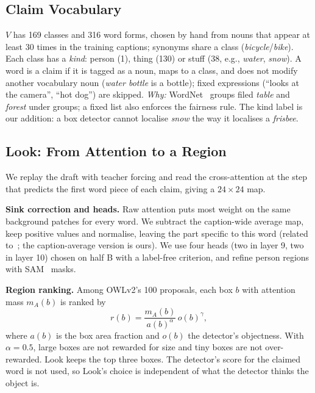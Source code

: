 \documentclass[conference]{IEEEtran}
\begin{document}
\subsection{Claim Vocabulary}
$V$ has 169 classes and 316 word forms, chosen by hand from nouns that appear at least 30 times in the
training captions; synonyms share a class (\emph{bicycle}/\emph{bike}). Each class has a \emph{kind}: person
(1), thing (130) or stuff (38, e.g., \emph{water}, \emph{snow}). A word is a claim if it is tagged as a noun,
maps to a class, and does not modify another vocabulary noun (\emph{water bottle} is a bottle); fixed
expressions (``looks at the camera'', ``hot dog'') are skipped. \emph{Why:} WordNet~\cite{miller1995wordnet}
groups filed \emph{table} and \emph{forest} under groups; a fixed list also enforces the fairness rule. The
kind label is our addition: a box detector cannot localise \emph{snow} the way it localises a \emph{frisbee}.

\subsection{Look: From Attention to a Region}
\label{sec:design-look}
We replay the draft with teacher forcing and read the cross-attention at the step that predicts the first word
piece of each claim, giving a $24\times24$ map.

\textbf{Sink correction and heads.} Raw attention puts most weight on the same background patches for every
word. We subtract the caption-wide average map, keep positive values and normalise, leaving the part specific
to this word (related to~\cite{darcet2024vision,xiao2024efficient}; the caption-average version is ours). We
use four heads (two in layer 9, two in layer 10) chosen on half B with a label-free criterion, and refine
person regions with SAM~\cite{kirillov2023segment} masks.

\textbf{Region ranking.} Among OWLv2's 100 proposals, each box $b$ with attention mass $m_A(b)$ is ranked by
\begin{equation}
r(b) = \frac{m_A(b)}{a(b)^{\alpha}}\, o(b)^{\gamma},
\label{eq:rank}
\end{equation}
where $a(b)$ is the box area fraction and $o(b)$ the detector's objectness. With $\alpha=0.5$, large boxes are
not rewarded for size and tiny boxes are not over-rewarded. Look keeps the top three boxes. The detector's
score for the claimed word is not used, so Look's choice is independent of what the detector thinks the object
is.
\end{document}
